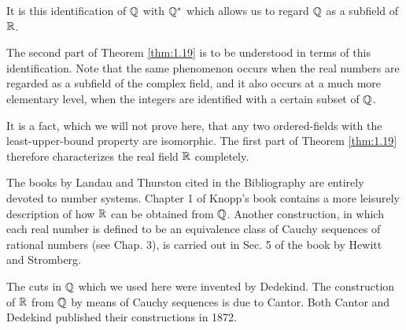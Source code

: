 It is this identification of ${\protect\mathbb Q}$ with ${\protect\mathbb Q}^*$ which allows us to regard ${\protect\mathbb Q}$ as a subfield of ${\protect\mathbb R}$.

The second part of Theorem \ref{thm:1.19} is to be understood in terms of this identification. 
Note that the same phenomenon occurs when the real numbers are regarded as a subfield of the complex field, 
and it also occurs at a much more elementary level, when the integers are identified with a certain subset of ${\protect\mathbb Q}$.

It is a fact, which we will not prove here, that any two ordered-fields with the least-upper-bound property are isomorphic. 
The first part of Theorem \ref{thm:1.19} therefore characterizes the real field ${\protect\mathbb R}$ completely.

The books by Landau and Thurston cited in the Bibliography are entirely devoted to number systems. 
Chapter 1 of Knopp's book contains a more leisurely description of how ${\protect\mathbb R}$ can be obtained from ${\protect\mathbb Q}$. 
Another construction, 
in which each real number is defined to be an equivalence class of Cauchy sequences of rational numbers (see Chap. 3), 
is carried out in Sec. 5 of the book by Hewitt and Stromberg.

The cuts in ${\protect\mathbb Q}$ which we used here were invented by Dedekind. 
The construction of ${\protect\mathbb R}$ from ${\protect\mathbb Q}$ by means of Cauchy sequences is due to Cantor. 
Both Cantor and Dedekind published their constructions in 1872.
